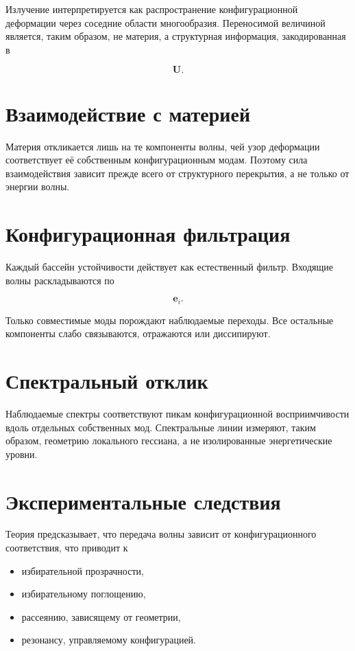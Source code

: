 Излучение интерпретируется как распространение конфигурационной деформации через соседние области многообразия. Переносимой величиной является, таким образом, не материя, а структурная информация, закодированная в

\[ \mathbf U. \]

\section{Взаимодействие с материей}

Материя откликается лишь на те компоненты волны, чей узор деформации соответствует её собственным конфигурационным модам. Поэтому сила взаимодействия зависит прежде всего от структурного перекрытия, а не только от энергии волны.

\section{Конфигурационная фильтрация}

Каждый бассейн устойчивости действует как естественный фильтр. Входящие волны раскладываются по

\[ \mathbf e_i. \]

Только совместимые моды порождают наблюдаемые переходы. Все остальные компоненты слабо связываются, отражаются или диссипируют.

\section{Спектральный отклик}

Наблюдаемые спектры соответствуют пикам конфигурационной восприимчивости вдоль отдельных собственных мод. Спектральные линии измеряют, таким образом, геометрию локального гессиана, а не изолированные энергетические уровни.

\section{Экспериментальные следствия}

Теория предсказывает, что передача волны зависит от конфигурационного соответствия, что приводит к

\begin{itemize}

\item избирательной прозрачности,

\item избирательному поглощению,

\item рассеянию, зависящему от геометрии,

\item резонансу, управляемому конфигурацией.

\end{itemize}

